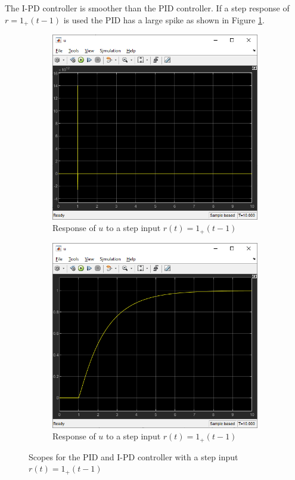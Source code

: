 The I-PD controller is smoother than the PID controller. If a step response of 
$r= 1_{+}(t-1)$ is used the PID has a large spike as shown in Figure \ref{fig:Q1BadScopes}.

\begin{figure}[h]
    \centering
    \begin{subfigure}[b]{0.45\linewidth}
        \includegraphics[width=\linewidth]{Questions/Figures/Q1PIDuBad.png}
        \caption{Response of $u$ to a step input $r(t) = 1_{+}(t-1)$}
    \end{subfigure}
    \begin{subfigure}[b]{0.45\linewidth}
        \includegraphics[width=\linewidth]{Questions/Figures/Q1IPDuBad.png}
        \caption{Response of $u$ to a step input $r(t) = 1_{+}(t-1)$}
    \end{subfigure}
    \caption{Scopes for the PID and I-PD controller with a step input $r(t) = 1_{+}(t-1)$}
    \label{fig:Q1BadScopes}
\end{figure}    